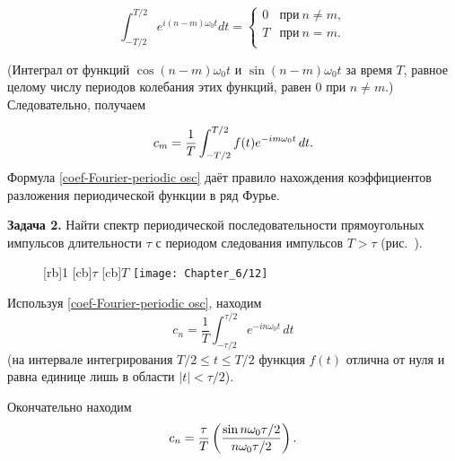 \begin{equation*}
	\int_{-T/2}^{T/2}e^{i(n-m)\omega_0 t}dt =
	\begin{cases}
		0 & \text{при}~ n\ne m,\\
		T & \text{при}~ n = m.\\
	\end{cases}
\end{equation*}

(Интеграл от функций $\cos(n-m)\omega_0t$ и $\sin(n-m)\omega_0t$ за время $T$, равное целому числу периодов колебания этих
функций, равен 0 при $n\ne m$.) Следовательно, получаем

\begin{equation}
	\eqmark{coef-Fourier-periodic osc}
	c_m=\frac{1}{T}\int_{-T/2}^{T/2} f(t)e^{-im\omega_0 t}\,dt.
\end{equation}
Формула \eqref{coef-Fourier-periodic osc} даёт правило нахождения коэффициентов разложения периодической функции в ряд Фурье.

\textbf{Задача 2.} Найти спектр периодической последовательности прямоугольных импульсов длительности $\tau$ с периодом следования
импульсов $T>\tau$ (рис.~).

\begin{wrapfigure}[]{r}{0.4\textwidth}
	[rb]{1}
	[cb]{$\tau$}
	[cb]{$T$}
	\texttt{[image: Chapter\_6/12]}
	\caption{}
\end{wrapfigure}
Используя \eqref{coef-Fourier-periodic osc}, находим
\begin{equation*}
	c_n =\frac{1}{T}\int_{-\tau/2}^{\tau/2} e^{-in\omega_0 t}\,dt
\end{equation*}
(на интервале интегрирования $T/2\le t \le T/2$ функция $f(t)$ отлична от нуля и равна единице лишь в области
$|t|<\tau/2$). 

%

Окончательно находим
\begin{equation}
	\eqmark{coef-Fourier-meander}
	c_n=\frac{\tau}{T}\left(\frac{\sin n\omega_0\tau/2}{n\omega_0\tau/2}\right).
\end{equation}

